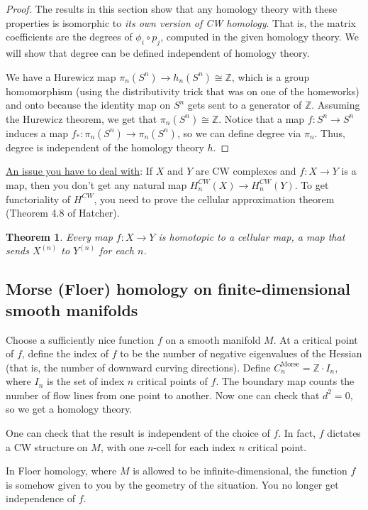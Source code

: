 \documentclass[12pt]{article}
\theoremstyle{plain}
\newtheorem{theorem}[equation]{Theorem}
\theoremstyle{definition}
\theoremstyle{remark}
\newcommand{\ZZ}{\ensuremath{\mathbb{Z}}}
\begin{document}
 \begin{proof}
   The results in this section show that any homology theory with these properties is
   isomorphic to \emph{its own version of CW homology}. That is, the matrix coefficients
   are the degrees of $\phi_i\circ p_j$, computed in the given homology theory. We will
   show that degree can be defined independent of homology theory.

   We have a Hurewicz map $\pi_n(S^n)\to h_n(S^n)\cong \ZZ$, which is a group
   homomorphism (using the distributivity trick that was on one of the homeworks) and
   onto because the identity map on $S^n$ gets sent to a generator of $\ZZ$. Assuming the
   Hurewicz theorem, we get that $\pi_n(S^n)\cong \ZZ$. Notice that a map $f:S^n\to S^n$
   induces a map $f_*:\pi_n(S^n)\to \pi_n(S^n)$, so we can define degree via $\pi_n$.
   Thus, degree is independent of the homology theory $h$.
 \end{proof}

 \underline{An issue you have to deal with}: If $X$ and $Y$ are CW complexes and $f:X\to
 Y$ is a map, then you don't get any natural map $H^{CW}_n(X)\to H^{CW}_n(Y)$. To get
 functoriality of $H^{CW}$, you need to prove the cellular approximation theorem (Theorem
 4.8 of Hatcher).
 \begin{theorem}
   Every map $f:X\to Y$ is homotopic to a cellular map, a map that sends $X^{(n)}$ to
   $Y^{(n)}$ for each $n$.
 \end{theorem}

 \subsection*{Morse (Floer) homology on finite-dimensional smooth manifolds}
 Choose a sufficiently nice function $f$ on a smooth manifold $M$. At a critical point of
 $f$, define the index of $f$ to be the number of negative eigenvalues of the Hessian
 (that is, the number of downward curving directions). Define $C_n^\text{Morse} =
 \ZZ\cdot I_n$, where $I_n$ is the set of index $n$ critical points of $f$. The boundary
 map counts the number of flow lines from one point to another. Now one can check that
 $d^2=0$, so we get a homology theory.

 One can check that the result is independent of the choice of $f$. In fact, $f$ dictates
 a CW structure on $M$, with one $n$-cell for each index $n$ critical point.

 In Floer homology, where $M$ is allowed to be infinite-dimensional, the function $f$ is
 somehow given to you by the geometry of the situation. You no longer get independence of
 $f$.
\end{document}
